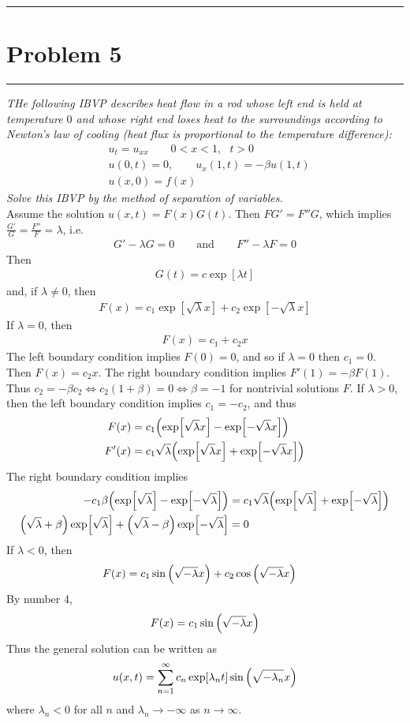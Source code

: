 \documentclass{article} %
\theoremstyle{plain}
\newcommand{\problem}[1]{
\vspace{.375cm}
\begin{minipage}{\textwidth}
    \begin{center}
        \noindent\rule{5cm}{1pt}
    \end{center}
    \section{\bf #1}
    \begin{center}
        \noindent\rule{5cm}{1pt}
    \end{center}
    \vspace{0.25cm}
\end{minipage}
}
\begin{document}
\problem{Problem 5}
\emph{THe following IBVP describes heat flow in a rod whose left end is held at temperature $0$ and whose right end loses heat to the surroundings according to Newton's law of cooling (heat flux is proportional to the temperature difference):}
\begin{align*}
    &u_t = u_{xx} \qquad 0 < x < 1,\ \ \ t > 0 \\
    &u(0, t) = 0, \qquad u_x(1, t) = -\beta u(1,t) \\
    &u(x,0) = f(x)
\end{align*}
\emph{Solve this IBVP by the method of separation of variables.} \\

Assume the solution $u(x,t) = F(x)G(t)$.  Then $FG' = F''G$, which implies $\frac{G'}{G} = \frac{F''}{F} = \lambda$, i.e.
\begin{align*}
    G' - \lambda G = 0 \qquad \text{and} \qquad F'' - \lambda F = 0
\end{align*}
Then
\begin{align*}
    G(t) = c\exp[\lambda t]
\end{align*}
and, if $\lambda \neq 0$, then
\begin{align*}
    F(x) = c_1\exp[\sqrt{\lambda}x] + c_2\exp[-\sqrt{\lambda}x]
\end{align*}
If $\lambda = 0$, then
\begin{align*}
    F(x) = c_1 + c_2x
\end{align*}
The left boundary condition implies $F(0) = 0$, and so if $\lambda = 0$ then $c_1 = 0$.  Then $F(x) = c_2 x$.  The right boundary condition implies $F'(1) = -\beta F(1)$.  Thus $c_2 = -\beta c_2 \iff c_2(1 + \beta) = 0 \iff \beta = -1$ for nontrivial solutions $F$.  If $\lambda > 0$, then the left boundary condition implies $c_1 = -c_2$, and thus
\begin{align*}
    F(x) &= c_1\qty(\exp[\sqrt{\lambda}x] - \exp[-\sqrt{\lambda}x]) \\
    F'(x) &= c_1\sqrt{\lambda}\qty(\exp[\sqrt{\lambda}x] + \exp[-\sqrt{\lambda}x])
\end{align*}
The right boundary condition implies
\begin{align*}
    -c_1\beta \qty(\exp[\sqrt{\lambda}] - \exp[-\sqrt{\lambda}]) &= c_1\sqrt{\lambda}\qty(\exp[\sqrt{\lambda}] + \exp[-\sqrt{\lambda}]) \\
    \qty(\sqrt{\lambda} + \beta)\exp[\sqrt{\lambda}] + \qty(\sqrt{\lambda} - \beta)\exp[-\sqrt{\lambda}] &= 0
\end{align*}
If $\lambda < 0$, then
\begin{align*}
    F(x) &= c_1\sin\qty(\sqrt{-\lambda}x) + c_2\cos\qty(\sqrt{-\lambda}x)
\end{align*}
By number 4, 
\begin{align*}
    F(x) = c_1\sin\qty(\sqrt{-\lambda}x)
\end{align*}
Thus the general solution can be written as
\begin{align*}
    u(x,t) = \sum_{n=1}^\infty c_n\exp[\lambda_n t]\sin\qty(\sqrt{-\lambda_n}x)
\end{align*}
where $\lambda_n < 0$ for all $n$ and $\lambda_n \rightarrow -\infty$ as $n \rightarrow \infty$.
\end{document}
